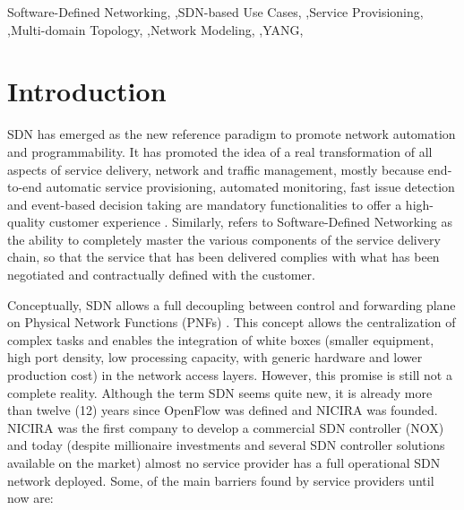\documentclass[a4paper,fleqn]{cas-dc}
\begin{document}


\begin{keywords}
Software-Defined Networking,
\sep SDN-based Use Cases, 
\sep Service Provisioning,
\sep Multi-domain Topology,
\sep Network Modeling, 
\sep YANG,  
\end{keywords}

\maketitle

\section{Introduction}
SDN has emerged as the new reference paradigm to promote network automation and programmability. It has promoted the idea of a real transformation of all aspects of service delivery, network and traffic management, mostly because end-to-end automatic service provisioning, automated monitoring, fast issue detection and event-based decision taking are mandatory functionalities to offer a high-quality customer experience \cite{ordonez2017network,ong2017onf}. Similarly, \cite{boucadair2014software} refers to Software-Defined Networking as the ability to completely master the various components of the service delivery chain, so that the service that has been delivered complies with what has been negotiated and contractually defined with the customer.

Conceptually, SDN allows a full decoupling between control and forwarding plane on Physical Network Functions (PNFs) \cite{brief2014openflow}. This concept allows the centralization of complex tasks and enables the integration of white boxes (smaller equipment, high port density, low processing capacity, with generic hardware and lower production cost) in the network access layers. However, this promise is still not a complete reality. Although the term SDN seems quite new, it is already more than twelve (12) years since OpenFlow \cite{brief2014openflow} was defined and NICIRA was founded. NICIRA was the first company to develop a commercial SDN controller (NOX) \cite{gude2008nox,tavakoli2009applying} and today (despite millionaire investments and several SDN controller solutions available \cite{medved2014opendaylight,berde2014onos} on the market) almost no service provider has a full operational SDN network deployed. Some, of the main barriers found by service providers until now are:
\end{document}
